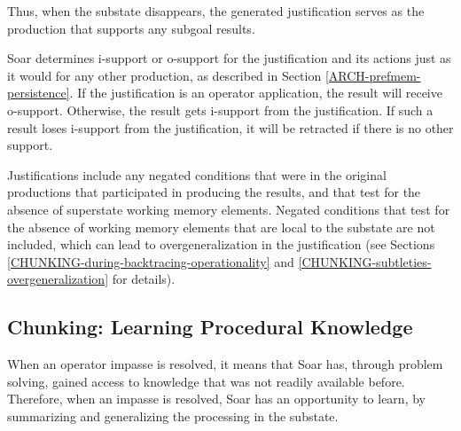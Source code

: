 Thus, when the substate disappears, the generated justification serves as the production that supports any subgoal results.

Soar determines i-support or o-support for the justification and its actions just as it would for any other production, as described in Section \ref{ARCH-prefmem-persistence}.  If the justification is an operator application, the result will receive o-support.  Otherwise, the result gets i-support from the justification. If such a result loses i-support from the justification, it will be retracted if there is no other support.

Justifications include any negated conditions that were in the original productions that participated in producing the results, and that test for the absence of superstate working memory elements. Negated conditions that test for the absence of working memory elements that are local to the substate are not included, which can lead to overgeneralization in the justification (see Sections \ref{CHUNKING-during-backtracing-operationality} and \ref{CHUNKING-subtleties-overgeneralization} for details).



\subsection{Chunking: Learning Procedural Knowledge}
\label{ARCH-learning} 

When an operator impasse is resolved, it means that Soar has, through problem solving, gained access to knowledge that was not readily available before. Therefore, when an impasse is resolved, Soar has an opportunity to learn, by summarizing and generalizing the processing in the substate. 


